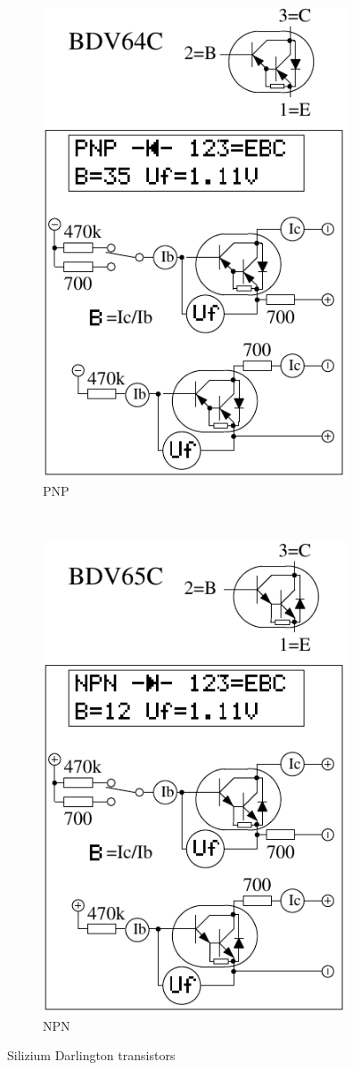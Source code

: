 \begin{figure}[H]
  \begin{subfigure}[b]{9cm}
    \centering
    \includegraphics[width=9cm]{../FIG/BJT_BDV64.pdf}
    \caption{PNP}
    \label{fig:BJT-PNP-Darl-R-D}
  \end{subfigure}
  ~
  \begin{subfigure}[b]{9cm}
    \centering
    \includegraphics[width=9cm]{../FIG/BJT_BDV65.pdf}
    \caption{NPN}
    \label{fig:BJT-NPN-Darl-R-D}
  \end{subfigure}
  \caption{Silizium Darlington transistors}
\end{figure}
